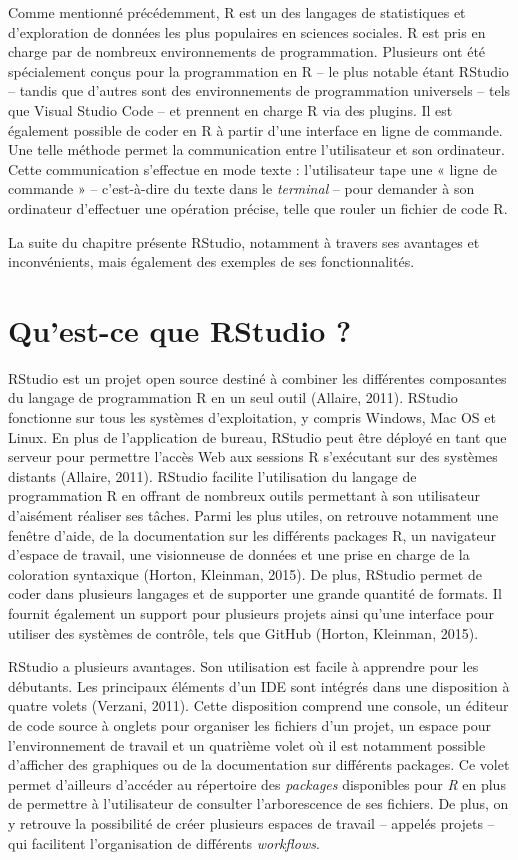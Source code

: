 \documentclass[
  letterpaper,
]{scrbook}
\begin{document}
Comme mentionné précédemment, R est un des langages de statistiques et
d'exploration de données les plus populaires en sciences sociales. R est
pris en charge par de nombreux environnements de programmation.
Plusieurs ont été spécialement conçus pour la programmation en R -- le
plus notable étant RStudio -- tandis que d'autres sont des
environnements de programmation universels -- tels que Visual Studio
Code -- et prennent en charge R via des plugins. Il est également
possible de coder en R à partir d'une interface en ligne de commande.
Une telle méthode permet la communication entre l'utilisateur et son
ordinateur. Cette communication s'effectue en mode texte : l'utilisateur
tape une « ligne de commande » -- c'est-à-dire du texte dans le
\emph{terminal} -- pour demander à son ordinateur d'effectuer une
opération précise, telle que rouler un fichier de code R.

La suite du chapitre présente RStudio, notamment à travers ses avantages
et inconvénients, mais également des exemples de ses fonctionnalités.

\hypertarget{quest-ce-que-rstudio}{%
\section{Qu'est-ce que RStudio ?}\label{quest-ce-que-rstudio}}

RStudio est un projet open source destiné à combiner les différentes
composantes du langage de programmation R en un seul outil (Allaire,
2011). RStudio fonctionne sur tous les systèmes d'exploitation, y
compris Windows, Mac OS et Linux. En plus de l'application de bureau,
RStudio peut être déployé en tant que serveur pour permettre l'accès Web
aux sessions R s'exécutant sur des systèmes distants (Allaire, 2011).
RStudio facilite l'utilisation du langage de programmation R en offrant
de nombreux outils permettant à son utilisateur d'aisément réaliser ses
tâches. Parmi les plus utiles, on retrouve notamment une fenêtre d'aide,
de la documentation sur les différents packages R, un navigateur
d'espace de travail, une visionneuse de données et une prise en charge
de la coloration syntaxique (Horton, Kleinman, 2015). De plus, RStudio
permet de coder dans plusieurs langages et de supporter une grande
quantité de formats. Il fournit également un support pour plusieurs
projets ainsi qu'une interface pour utiliser des systèmes de contrôle,
tels que GitHub (Horton, Kleinman, 2015).

RStudio a plusieurs avantages. Son utilisation est facile à apprendre
pour les débutants. Les principaux éléments d'un IDE sont intégrés dans
une disposition à quatre volets (Verzani, 2011). Cette disposition
comprend une console, un éditeur de code source à onglets pour organiser
les fichiers d'un projet, un espace pour l'environnement de travail et
un quatrième volet où il est notamment possible d'afficher des
graphiques ou de la documentation sur différents packages. Ce volet
permet d'ailleurs d'accéder au répertoire des \emph{packages}
disponibles pour \emph{R} en plus de permettre à l'utilisateur de
consulter l'arborescence de ses fichiers. De plus, on y retrouve la
possibilité de créer plusieurs espaces de travail -- appelés projets --
qui facilitent l'organisation de différents \emph{workflows}.
\end{document}
